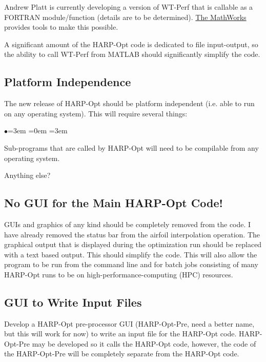 \documentclass[12pt]{article}
\begin{document}
Andrew Platt is currently developing a version of WT-Perf that is callable as a FORTRAN module/function (details are to be determined). \href{http://www.mathworks.com/help/techdoc/matlab_external/f29502.html}{\color{blue}The MathWorks} provides tools to make this possible.

A significant amount of the HARP-Opt code is dedicated to file input-output, so the ability to call WT-Perf from MATLAB should significantly simplify the code.

\subsection{Platform Independence}
The new release of HARP-Opt should be platform independent (i.e. able to run on any operating system). This will require several things:
\begin{list}{$\bullet$}{\leftmargin=3em \itemindent=0em \rightmargin=3em}
    \item Sub-programs that are called by HARP-Opt will need to be compilable from any operating system.
    \item Anything else?
\end{list}

\subsection{No GUI for the Main HARP-Opt Code!}
GUIs and graphics of any kind should be completely removed from the code. I have already removed the status bar from the airfoil interpolation operation. The graphical output that is displayed during the optimization run should be replaced with a text based output. This should simplify the code. This will also allow the program to be run from the command line and for batch jobs consisting of many HARP-Opt runs to be on high-performance-computing (HPC) resources.

\subsection{GUI to Write Input Files}
Develop a HARP-Opt pre-processor GUI (HARP-Opt-Pre, need a better name, but this will work for now) to write an input file for the HARP-Opt code. HARP-Opt-Pre may be developed so it calls the HARP-Opt code, however, the code of the HARP-Opt-Pre will be completely separate from the HARP-Opt code. 
\end{document}
